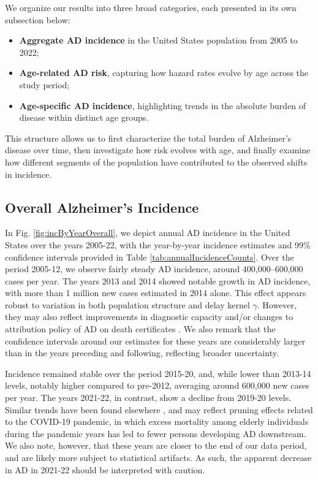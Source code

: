 \documentclass{article}
\begin{document}
We organize our results into three broad categories, each presented in its own subsection below:
\begin{itemize}
\item \textbf{Aggregate AD incidence} in the United States population from 2005 to 2022;
\item \textbf{Age-related AD risk}, capturing how hazard rates evolve by age across the study period;
\item \textbf{Age-specific AD incidence}, highlighting trends in the absolute burden of disease within distinct age groups.
\end{itemize}

This structure allows us to first characterize the total burden of Alzheimer’s disease over time, then investigate how risk evolves with age, and finally examine how different segments of the population have contributed to the observed shifts in incidence.


\subsection{Overall Alzheimer's Incidence}
In Fig. \ref{fig:incByYearOverall}, we depict annual AD incidence in the United States over the years 2005-22, with the year-by-year incidence estimates and 99\% confidence intervals provided in Table \ref{tab:annualIncidenceCounts}. Over the period 2005-12, we observe fairly steady AD incidence, around 400,000–600,000 cases per year. The years 2013 and 2014 showed notable growth in AD incidence, with more than 1 million new cases estimated in 2014 alone. This effect appears robust to variation in both population structure and delay kernel $\gamma$. However, they may also reflect improvements in diagnostic capacity and/or changes to attribution policy of AD on death certificates \cite{national2023physicians}. We also remark that the confidence intervals around our estimates for these years are considerably larger than in the years preceding and following, reflecting broader uncertainty.
\par Incidence remained stable over the period 2015-20, and, while lower than 2013-14 levels, notably higher compared to pre-2012, averaging around 600,000 new cases per year. The years 2021-22, in contrast, show a decline from 2019-20 levels. Similar trends have been found elsewhere \cite{freedman2024dementia, alzheimer2025}, and may reflect pruning effects related to the COVID-19 pandemic, in which excess mortality among elderly individuals during the pandemic years has led to fewer persons developing AD downstream. We also note, however, that these years are closer to the end of our data period, and are likely more subject to statistical artifacts. As such, the apparent decrease in AD in 2021-22 should be interpreted with caution.
\end{document}
